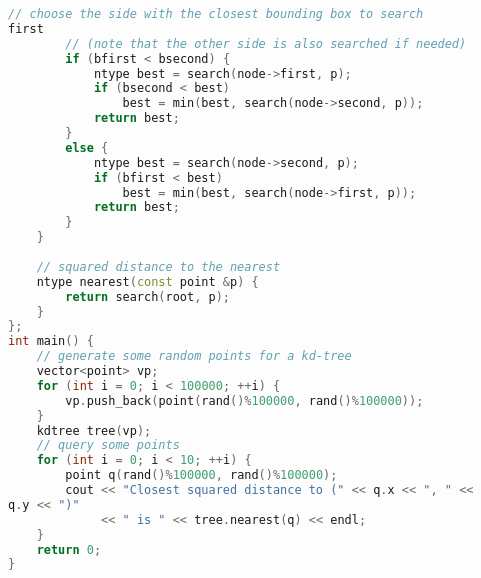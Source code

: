 \begin{lstlisting}[language=C++]
        // choose the side with the closest bounding box to search 
first
        // (note that the other side is also searched if needed)
        if (bfirst < bsecond) {
            ntype best = search(node->first, p);
            if (bsecond < best)
                best = min(best, search(node->second, p));
            return best;
        }
        else {
            ntype best = search(node->second, p);
            if (bfirst < best)
                best = min(best, search(node->first, p));
            return best;
        }
    }
    
    // squared distance to the nearest 
    ntype nearest(const point &p) {
        return search(root, p);
    }
};
int main() {
    // generate some random points for a kd-tree
    vector<point> vp;
    for (int i = 0; i < 100000; ++i) {
        vp.push_back(point(rand()%100000, rand()%100000));
    }
    kdtree tree(vp);
    // query some points
    for (int i = 0; i < 10; ++i) {
        point q(rand()%100000, rand()%100000);
        cout << "Closest squared distance to (" << q.x << ", " << 
q.y << ")"
             << " is " << tree.nearest(q) << endl;
    }
    return 0;
}
\end{lstlisting}
